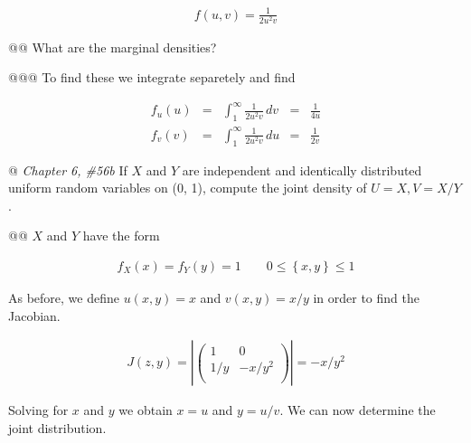 \documentclass[11pt]{article}\usepackage[]{graphicx}\usepackage[]{xcolor}
\begin{document}
\begin{easylist}[enumerate]
    \begin{equation}
        \begin{aligned}
            f(u, v) = \frac{1}{2u^2v}
        \end{aligned}
    \end{equation}

    @@ What are the marginal densities?

    @@@ To find these we integrate separetely and find

    \begin{equation}
        \begin{aligned}
            f_u(u) &=& \int^\infty_1
                \frac{1}{2u^2v}
                \, dv &=& \frac{1}{4u}\\
            f_v(v) &=& \int^\infty_1
                \frac{1}{2u^2v}
                \, du &=& \frac{1}{2v}
        \end{aligned}
    \end{equation}

    @ \textit{Chapter 6, \#56b} If $X$ and $Y$ are independent and identically distributed uniform random variables on
    (0, 1), compute the joint density of $U = X, V = X/Y$.

    @@ $X$ and $Y$ have the form

    \begin{equation}
        \begin{aligned}
            f_X(x) = f_Y(y) = 1 \qquad 0 \le \left\{ x,y \right\} \le 1
        \end{aligned}
    \end{equation}

    As before, we define $u(x,y)=x$ and $v(x,y)=x/y$ in order to find the Jacobian.

    \begin{equation}
        \begin{aligned}
            J(z,y) = \left| \begin{pmatrix}
                                1 & 0\\
                                1/y & -x/y^2\\
                            \end{pmatrix}
                          \right| = -x/y^2
        \end{aligned}
    \end{equation}

    Solving for $x$ and $y$ we obtain $x=u$ and $y=u/v$. We can now determine the joint distribution.


\end{easylist}
\end{document}

